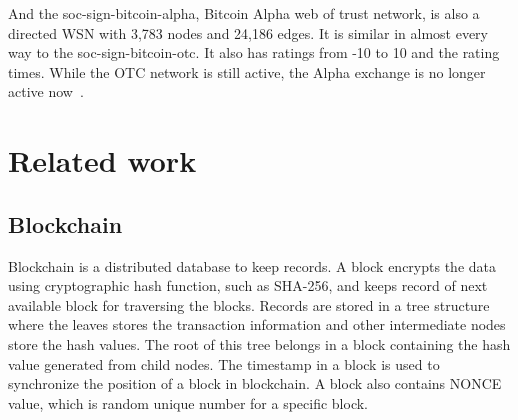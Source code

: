 \documentclass[onecolumn, 12pt]{IEEEtran}
\begin{document}
And the soc-sign-bitcoin-alpha, Bitcoin Alpha web of trust network, is also a directed WSN with 3,783 nodes and 24,186 edges.
It is similar in almost every way to the soc-sign-bitcoin-otc. It also has ratings from -10 to 10 and the rating times. While the OTC network
is still active, the Alpha exchange is no longer active now~\cite{moindrot2017trust}.

\section{Related work}
\subsection{Blockchain}
Blockchain is a distributed database to keep records. 
A block encrypts the data using cryptographic hash function, such as SHA-256, and keeps record of next available block for traversing the blocks.
Records are stored in a tree structure where the leaves stores the transaction information and other intermediate nodes store the hash values. The root of this tree belongs in a block containing the hash value generated from child nodes.
The timestamp in a block is used to synchronize the position of a block in blockchain.
A block also contains NONCE value, which is random unique number for a specific block.
\end{document}
